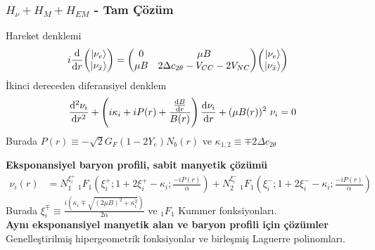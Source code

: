 \documentclass[10pt]{beamer}
\begin{document}
\begin{frame}
    \frametitle{$H_{\nu}+ H_{M}+ H_{EM}$ - Tam Çözüm}
    Hareket denklemi
    \scriptsize
    \begin{align*}
        i\dv{}{r} \mqty(\ket{\nu_{e}} \\ \ket{\nu_{\bar{x}}}) &= 
        \mqty(0 & \mu B \\ \mu B & 2\Delta c_{2\theta}-V_{CC}-2V_{NC}    ) 
        \mqty(\ket{\nu_{e}}\\ \ket{\nu_{\bar{x}}})
    \end{align*}
    \normalsize
    İkinci dereceden diferansiyel denklem
    \scriptsize
    \begin{equation*}
        \dv[2]{\nu_{i}}{r} + \left(i\kappa_{i}+iP(r) + \frac{\dv{B}{r}}{B(r)}\right) 
    \dv{\nu_{i}}{r}+ (\mu B(r))^{2}~ \nu_{i} = 0
    \end{equation*}
    \normalsize
    {\tiny Burada $ P(r) \equiv -\sqrt{2}G_{F}(1-2Y_{e})N_{b}(r) $ ve $ \kappa_{1,2} \equiv \mp 2\Delta c_{2\theta} $}
    
    \textbf{Eksponansiyel baryon profili, sabit manyetik çözümü}
    \tiny
    \begin{align*}
        \nu_{i}(r) & = N_{1}^{\xi^{+}_{i}}~ _{1}F_{1}\left(\xi^{+}_{i}; 
        1+2\xi^{+}_{i}-\kappa_{i};\frac{-iP(r)}{\alpha} \right) + N_{2}^{\xi^{-}_{i}} ~ _{1}F_{1}\left(\xi^{-}_{i}; 1+2\xi^{-}_{i}-
        \kappa_{i};\frac{-iP(r)}{\alpha}\right)
    \end{align*}
    {\tiny Burada $\xi^{\mp}_{i} \equiv \frac{i(\kappa_{i} \mp \sqrt{(2\mu B)^{2} + 
    \kappa^{2}_{i} } )}{2\alpha}$ ve $ _{1}F_{1} $ Kummer fonksiyonları.\\}
    \normalsize
    \textbf{Aynı eksponansiyel manyetik alan ve baryon profili için çözümler}\\
    {\scriptsize Genelleştirilmiş hipergeometrik fonksiyonlar ve birleşmiş Laguerre polinomları.}
    \normalsize
\end{frame}
\end{document}
